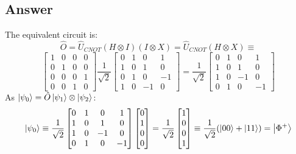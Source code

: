 \documentclass{article}
\begin{document}
\subsection{Answer}
The equivalent circuit is:
$$\hat{O} = \hat{U}_{CNOT}(H\otimes I)(I\otimes X) = \hat{U}_{CNOT}(H\otimes X) \equiv $$
$$\begin{bmatrix}
    1 & 0 & 0 & 0\\
    0 & 1 & 0 & 0\\
    0 & 0 & 0 & 1\\
    0 & 0 & 1 & 0
\end{bmatrix}\frac{1}{\sqrt{2}}\begin{bmatrix}
    0 & 1 & 0 & 1  \\
    1 & 0 & 1 & 0 \\
    0 & 1 & 0 & -1  \\
    1 & 0 & -1 & 0
\end{bmatrix} = \frac{1}{\sqrt{2}}\begin{bmatrix}
    0 & 1 & 0 & 1 \\
    1 & 0 & 1 & 0 \\
    1 & 0 & -1& 0 \\
    0 & 1 & 0 & -1
\end{bmatrix}$$
As $\ket{\psi_0} = \hat{O}\ket{\psi_1}\otimes \ket{\psi_2}$:
$$\ket{\psi_0} \equiv \frac{1}{\sqrt{2}}\begin{bmatrix}
    0 & 1 & 0 & 1 \\
    1 & 0 & 1 & 0 \\
    1 & 0 & -1& 0 \\
    0 & 1 & 0 & -1
\end{bmatrix} \begin{bmatrix}
    0 \\ 1 \\ 0 \\ 0
\end{bmatrix} = \frac{1}{\sqrt{2}}\begin{bmatrix}
    1 \\ 0 \\ 0 \\ 1
\end{bmatrix} \equiv \frac{1}{\sqrt{2}}(\ket{00}+\ket{11}) = \ket{\Phi^+}$$
\end{document}
